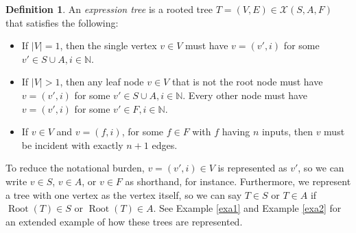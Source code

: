 \documentclass{article}
\theoremstyle{definition}
\newtheorem{defin}[thm]{Definition}
\DeclareMathOperator{\Root}{Root}
\begin{document}
\begin{defin} \label{def2}
    An \emph{expression tree} is a rooted tree $T = (V, E) \in \mathcal{X}(S, A, F)$ that satisfies the following:
    \begin{itemize}
        \item If $|V| = 1$, then the single vertex $v \in V$ must have $v = (v', i)$ for some $v' \in S \cup A, i \in \mathbb{N}$.
        \item If $|V| > 1$, then any leaf node $v \in V$ that is not the root node must have $v = (v', i)$ for some $v' \in S \cup A, i \in \mathbb{N}$. Every other node must have $v = (v', i)$ for some $v' \in F, i \in \mathbb{N}$.
        \item If $v \in V$ and $v = (f, i)$, for some $f \in F$ with $f$ having $n$ inputs, then $v$ must be incident with exactly $n+1$ edges.
    \end{itemize}
\end{defin}

To reduce the notational burden, $v = (v', i) \in V$ is represented as $v'$, so we can write $v \in S$, $v \in A$, or $v \in F$ as shorthand, for instance. Furthermore, we represent a tree with one vertex as the vertex itself, so we can say $T \in S$ or $T \in A$ if $\Root(T) \in S$ or $\Root(T) \in A$. See Example \ref{exa1} and Example \ref{exa2} for an extended example of how these trees are represented.
\end{document}
